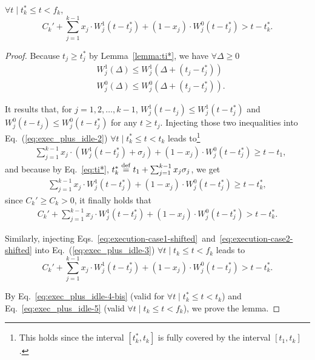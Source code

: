 \begin{Lemma}
\label{lemma:step-3-one-condition}
$\forall t \mid t_k^* \leq t < f_k$,
\begin{equation}
\label{eq:exec_plus_idle-almost-final} 
C_k'+\sum_{j=1}^{k-1} x_j\cdot W_j^1(t-t_j^*) + (1-x_j)\cdot W_j^0(t-t_j^*) > t-t_k^*.
\end{equation}  
\end{Lemma}
\begin{proof}
Because $t_j \geq t_j^*$ by Lemma~\ref{lemma:ti*}, we have $\forall \Delta \geq 0$
\begin{align}
  \label{eq:execution-case1-shifted}
&  W_j^1(\Delta)  \leq W_j^1(\Delta + (t_j-t_j^*)) \\
  \label{eq:execution-case2-shifted}
&  W_j^0(\Delta)  \leq W_j^0(\Delta + (t_j-t_j^*)).
\end{align}

It results that, for $j=1,2,\ldots,k-1$, $W_j^1(t-t_j)
\leq W_j^1(t-t_j^*)$ and $W_j^0(t-t_j) \leq W_j^0(t-t_j^*)$ for any $t
\geq t_j$. Injecting those two inequalities into 
Eq.~(\ref{eq:exec_plus_idle-2}) $\forall t \mid t_k^* \leq t < t_k$ leads to\footnote{This holds since the interval $[t_k^*, t_k]$ is fully covered by the interval $[t_1, t_k]$.}
{\small \begin{align*}
&\sum_{j=1}^{k-1} x_j\cdot (W_j^1(t-t_j^*)+\sigma_j) + (1-x_j)\cdot W_j^0(t-t_j^*) \geq t-t_1,
\end{align*}}
and because by Eq.~\eqref{eq:ti*}, $t_k^* \stackrel{\mathrm{def}}{=} t_1 + \sum_{j=1}^{k-1}x_j\sigma_j$, we get
{\small \begin{align}
\sum_{j=1}^{k-1} x_j\cdot W_j^1(t-t_j^*) + (1-x_j)\cdot W_j^0(t-t_j^*) \geq t-t_k^*,
\label{eq:exec_plus_idle-4}
\end{align}}%
since $C_k' \geq C_k > 0$, it finally holds that
{\small \begin{align}
C_k' + \sum_{j=1}^{k-1} x_j\cdot W_j^1(t-t_j^*) + (1-x_j)\cdot W_j^0(t-t_j^*) > t-t_k^*.
\label{eq:exec_plus_idle-4-bis}
\end{align}}

Similarly, injecting Eqs.~\eqref{eq:execution-case1-shifted}~and~\eqref{eq:execution-case2-shifted} into 
Eq.~(\ref{eq:exec_plus_idle-3}) $\forall t \mid t_k \leq t < f_k$ leads to 
{\small \begin{equation}
\label{eq:exec_plus_idle-5}
C_k'+\sum_{j=1}^{k-1} x_j\cdot W_j^1(t-t_j^*) + (1-x_j)\cdot W_j^0(t-t_j^*) > t-t_k^*.
\end{equation}}

By Eq.~\eqref{eq:exec_plus_idle-4-bis} (valid for $\forall t \mid t_k^* \leq t < t_k$) and Eq.~\eqref{eq:exec_plus_idle-5} (valid $\forall t \mid t_k \leq t < f_k$), we prove the lemma.
\end{proof}

